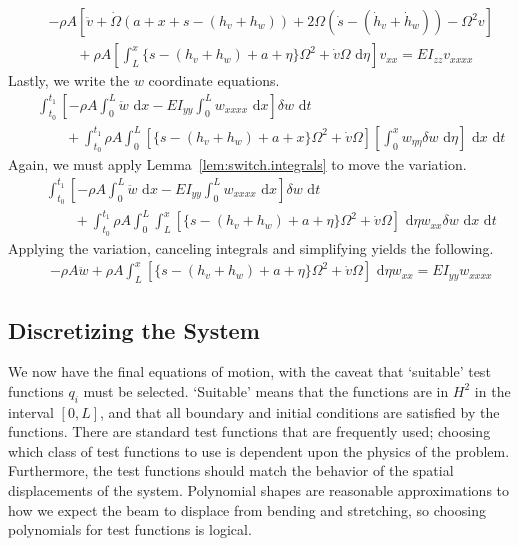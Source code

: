 \begin{eqnarray}
& & -\rho A [\ddot v + \dot \Omega (a+x+s-(h_v+h_w))+2\Omega(\dot s - (\dot h_v+\dot h_w))-\Omega^2v] \\ 
& & \qquad +\rho A \left[\int_L^x\lbrace s-(h_v+h_w)+a+\eta\rbrace\Omega^2+\dot v\Omega\text{ d}\eta\right] v_{xx} = EI_{zz}v_{xxxx}\nonumber
\end{eqnarray}
Lastly, we write the $w$ coordinate equations.
\begin{eqnarray}
& & \int_{t_0}^{t_1}\left[-\rho A\int_0^L \ddot w\text{ d}x-EI_{yy}\int_0^L w_{xxxx}\text{ d}x\right]\delta w\text{ d}t \\
& & \qquad +\int_{t_0}^{t_1}\rho A\int_0^L  [\lbrace s-(h_v+h_w)+a+x\rbrace\Omega^2+\dot v\Omega]\left[\int_0^xw_{\eta\eta}\delta w\text{ d}\eta\right]\text{ d}x\text{ d}t\nonumber 
\end{eqnarray}
Again, we must apply Lemma~\ref{lem:switch.integrals} to move the variation.
\begin{eqnarray}
& & \int_{t_0}^{t_1}\left[-\rho A\int_0^L \ddot w\text{ d}x-EI_{yy}\int_0^L w_{xxxx}\text{ d}x\right]\delta w\text{ d}t \\
& & \qquad +\int_{t_0}^{t_1}\rho A\int_0^L \int_L^x[\lbrace s-(h_v+h_w)+a+\eta \rbrace\Omega^2+\dot v\Omega]\text{ d}\eta w_{xx}\delta w\text{ d}x\text{ d}t\nonumber 
\end{eqnarray}
Applying the variation, canceling integrals and simplifying yields the following.
\begin{eqnarray}
& & -\rho A \ddot w+\rho A \int_L^x[\lbrace s-(h_v+h_w)+a+\eta \rbrace\Omega^2+\dot v\Omega]\text{ d}\eta w_{xx} = EI_{yy} w_{xxxx}
\end{eqnarray}

\subsection{Discretizing the System}
\label{subsec:discretizing}
We now have the final equations of motion, with the caveat that `suitable' test functions $q_i$ must be selected. `Suitable' means that the functions are in $H^2$ in the interval $[0,L]$, and that all boundary and initial conditions are satisfied by the functions. There are standard test functions that are frequently used; choosing which class of test functions to use is dependent upon the physics of the problem. Furthermore, the test functions should match the behavior of the spatial displacements of the system. Polynomial shapes are reasonable approximations to how we expect the beam to displace from bending and stretching, so choosing polynomials for test functions is logical.

